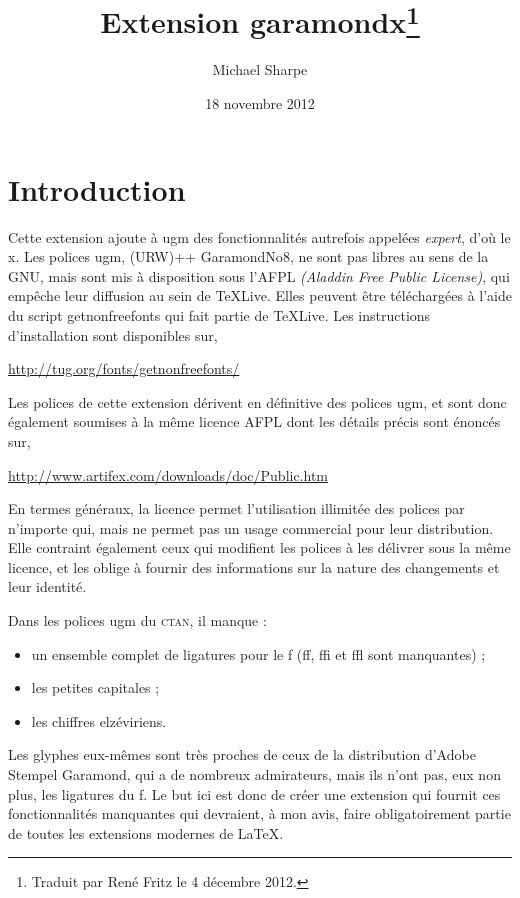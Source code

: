 \documentclass[12pt,english,french]{article}
\newcommand{\mnu}[1]{\textsf{#1}}
\newcommand\lig{\raisebox{-2.4pt}{\char21}}
\begin{document}
\title{Extension garamondx\thanks{Traduit par René Fritz le 4 décembre 2012.}}
\author{Michael Sharpe}
\date{18 novembre 2012}
\maketitle
\thispagestyle{empty}

\section{Introduction}


Cette extension ajoute à \mnu{ugm} des fonctionnalités autrefois appelées \emph{expert}, d'où le x. Les polices \mnu{ugm}, (URW)++ GaramondNo$8$, ne sont pas libres au sens de la GNU, mais sont mis à disposition sous l'AFPL \emph{(Aladdin Free Public License)}, qui empêche leur diffusion au sein de \TeX Live. Elles peuvent être téléchargées à l'aide du script \mnu{getnonfreefonts} qui fait partie de \TeX Live. Les instructions d'installation sont disponibles sur,

\noindent\url{http://tug.org/fonts/getnonfreefonts/}

Les polices de cette extension dérivent en définitive des polices \mnu{ugm}, et sont donc également soumises à la même licence AFPL dont les détails précis sont énoncés sur,

\noindent\url{http://www.artifex.com/downloads/doc/Public.htm}

En termes généraux, la licence permet l'utilisation illimitée des polices par n'importe qui, mais ne permet pas un usage commercial pour leur distribution. Elle contraint également ceux qui modifient les polices à les délivrer sous la même licence, et les oblige à fournir des informations sur la nature des changements et leur identité.

Dans les polices \mnu{ugm} du \textsc{ctan}, il manque :

\begin{itemize}
\item 
un ensemble complet de ligatures pour le f (f\lig f, f\lig f\lig i et f\lig f\lig l sont manquantes) ;
\item
les petites capitales ;
\item
les chiffres elzéviriens.
\end{itemize}

Les glyphes eux-mêmes sont très proches de ceux de la distribution d'Adobe Stempel Garamond, qui a de nombreux admirateurs, mais ils n'ont pas, eux non plus, les ligatures du f. Le but ici est donc de créer une extension qui fournit ces fonctionnalités manquantes qui devraient, à mon avis, faire obligatoirement partie de toutes les extensions modernes de \LaTeX.
\end{document}
